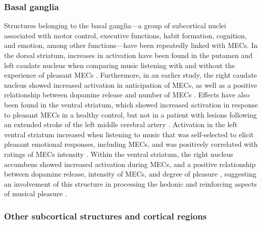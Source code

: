 \subsubsection{Basal ganglia}

Structures belonging to the basal ganglia---a group of subcortical nuclei associated with motor control, executive functions, habit formation, cognition, and emotion, among other functions---have been repeatedly linked with MECs. In the dorsal striatum, increases in activation have been found in the putamen and left caudate nucleus when comparing music listening with and without the experience of pleasant MECs \parencite{klepzig2020}. Furthermore, in an earlier study, the right caudate nucleus showed increased activation in anticipation of MECs, as well as a positive relationship between dopamine release and number of MECs \parencite{salimpoor2011}. Effects have also been found in the ventral striatum, which showed increased activation in response to pleasant MECs in a healthy control, but not in a patient with lesions following an extended stroke of the left middle cerebral artery \parencite{grunkina2017}. Activation in the left ventral striatum increased when listening to music that was self-selected to elicit pleasant emotional responses, including MECs, and was positively correlated with ratings of MECs intensity \parencite{blood2001}. Within the ventral striatum, the right nucleus accumbens showed increased activation during MECs, and a positive relationship between dopamine release, intensity of MECs, and degree of pleasure \parencite{salimpoor2011}, suggesting an involvement of this structure in processing the hedonic and reinforcing aspects of musical pleasure \parencite{chanda2013}.

\subsubsection{Other subcortical structures and cortical regions}


